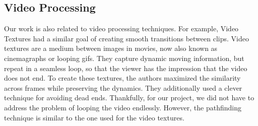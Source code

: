 \subsection{Video Processing}
Our work is also related to video processing techniques. For example, Video Textures \cite{videoTextures} had a similar goal of creating smooth transitions between clips. Video textures are a medium between images in movies, now also known as cinemagraphs or looping gifs. They capture dynamic moving information, but repeat in a seamless loop, so that the viewer has the impression that the video does not end. To create these textures, the authors maximized the similarity across frames while preserving the dynamics. They additionally used a clever technique for avoiding dead ends. Thankfully, for our project, we did not have to address the problem of looping the video endlessly. However, the pathfinding technique is similar to the one used for the video textures.